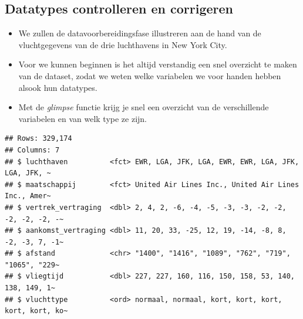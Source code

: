 \documentclass[]{tufte-book}
\providecommand{\tightlist}{%
  \setlength{\itemsep}{0pt}\setlength{\parskip}{0pt}}
\begin{document}
\hypertarget{datatypes-controlleren-en-corrigeren}{%
\subsection{Datatypes controlleren en corrigeren}\label{datatypes-controlleren-en-corrigeren}}

\begin{itemize}
\tightlist
\item
  We zullen de datavoorbereidingsfase illustreren aan de hand van de vluchtgegevens van de drie luchthavens in New York City.
\item
  Voor we kunnen beginnen is het altijd verstandig een snel overzicht te maken van de dataset, zodat we weten welke variabelen we voor handen hebben alsook hun datatypes.
\item
  Met de \emph{glimpse} functie krijg je snel een overzicht van de verschillende variabelen en van welk type ze zijn.
\end{itemize}

\begin{verbatim}
## Rows: 329,174
## Columns: 7
## $ luchthaven          <fct> EWR, LGA, JFK, LGA, EWR, EWR, LGA, JFK, LGA, JFK, ~
## $ maatschappij        <fct> United Air Lines Inc., United Air Lines Inc., Amer~
## $ vertrek_vertraging  <dbl> 2, 4, 2, -6, -4, -5, -3, -3, -2, -2, -2, -2, -2, -~
## $ aankomst_vertraging <dbl> 11, 20, 33, -25, 12, 19, -14, -8, 8, -2, -3, 7, -1~
## $ afstand             <chr> "1400", "1416", "1089", "762", "719", "1065", "229~
## $ vliegtijd           <dbl> 227, 227, 160, 116, 150, 158, 53, 140, 138, 149, 1~
## $ vluchttype          <ord> normaal, normaal, kort, kort, kort, kort, kort, ko~
\end{verbatim}
\end{document}
